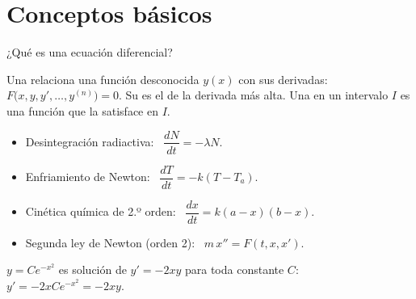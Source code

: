 \documentclass[10pt,aspectratio=169]{beamer}
\begin{document}
\section{Conceptos básicos}

\begin{frame}{¿Qué es una ecuación diferencial?}
  \begin{definicion}
    Una  relaciona una función desconocida $y(x)$ con sus derivadas:
    $F\big(x,y,y',\dots,y^{(n)}\big)=0$. Su  es el de la derivada más alta. Una  en un intervalo $I$
    es una función que la satisface en $I$.
  \end{definicion}
  \begin{ejemplo}[modelos]
    \begin{itemize}
      \item Desintegración radiactiva: \ $\dfrac{dN}{dt}=-\lambda N$.
      \item Enfriamiento de Newton: \ $\dfrac{dT}{dt}=-k(T-T_a)$.
      \item Cinética química de 2.º orden: \ $\dfrac{dx}{dt}=k(a-x)(b-x)$.
      \item Segunda ley de Newton (orden 2): \ $m\,x''=F(t,x,x')$.
    \end{itemize}
  \end{ejemplo}
  \begin{ejemplo}[verificación]
    $y=Ce^{-x^2}$ es solución de $y'=-2xy$ para toda constante $C$: \ $y'=-2xCe^{-x^2}=-2xy$. \checkmark
  \end{ejemplo}
\end{frame}
\end{document}
